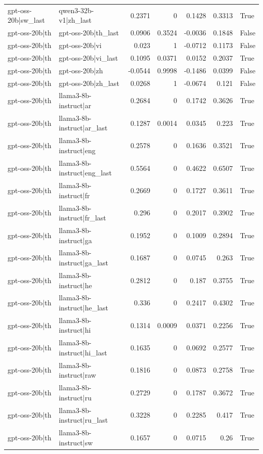 \begin{table}
\begin{tabular}{l l r r r r l}
gpt-oss-20b|sw_last & qwen3-32b-v1|zh_last & 0.2371 & 0 & 0.1428 & 0.3313 & True \\
gpt-oss-20b|th & gpt-oss-20b|th_last & 0.0906 & 0.3524 & -0.0036 & 0.1848 & False \\
gpt-oss-20b|th & gpt-oss-20b|vi & 0.023 & 1 & -0.0712 & 0.1173 & False \\
gpt-oss-20b|th & gpt-oss-20b|vi_last & 0.1095 & 0.0371 & 0.0152 & 0.2037 & True \\
gpt-oss-20b|th & gpt-oss-20b|zh & -0.0544 & 0.9998 & -0.1486 & 0.0399 & False \\
gpt-oss-20b|th & gpt-oss-20b|zh_last & 0.0268 & 1 & -0.0674 & 0.121 & False \\
gpt-oss-20b|th & llama3-8b-instruct|ar & 0.2684 & 0 & 0.1742 & 0.3626 & True \\
gpt-oss-20b|th & llama3-8b-instruct|ar_last & 0.1287 & 0.0014 & 0.0345 & 0.223 & True \\
gpt-oss-20b|th & llama3-8b-instruct|eng & 0.2578 & 0 & 0.1636 & 0.3521 & True \\
gpt-oss-20b|th & llama3-8b-instruct|eng_last & 0.5564 & 0 & 0.4622 & 0.6507 & True \\
gpt-oss-20b|th & llama3-8b-instruct|fr & 0.2669 & 0 & 0.1727 & 0.3611 & True \\
gpt-oss-20b|th & llama3-8b-instruct|fr_last & 0.296 & 0 & 0.2017 & 0.3902 & True \\
gpt-oss-20b|th & llama3-8b-instruct|ga & 0.1952 & 0 & 0.1009 & 0.2894 & True \\
gpt-oss-20b|th & llama3-8b-instruct|ga_last & 0.1687 & 0 & 0.0745 & 0.263 & True \\
gpt-oss-20b|th & llama3-8b-instruct|he & 0.2812 & 0 & 0.187 & 0.3755 & True \\
gpt-oss-20b|th & llama3-8b-instruct|he_last & 0.336 & 0 & 0.2417 & 0.4302 & True \\
gpt-oss-20b|th & llama3-8b-instruct|hi & 0.1314 & 0.0009 & 0.0371 & 0.2256 & True \\
gpt-oss-20b|th & llama3-8b-instruct|hi_last & 0.1635 & 0 & 0.0692 & 0.2577 & True \\
gpt-oss-20b|th & llama3-8b-instruct|raw & 0.1816 & 0 & 0.0873 & 0.2758 & True \\
gpt-oss-20b|th & llama3-8b-instruct|ru & 0.2729 & 0 & 0.1787 & 0.3672 & True \\
gpt-oss-20b|th & llama3-8b-instruct|ru_last & 0.3228 & 0 & 0.2285 & 0.417 & True \\
gpt-oss-20b|th & llama3-8b-instruct|sw & 0.1657 & 0 & 0.0715 & 0.26 & True \\

\end{tabular}
\end{table}
